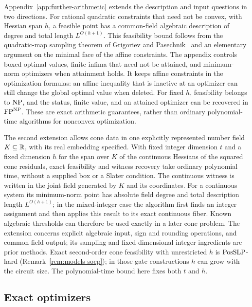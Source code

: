 Appendix~\ref{app:further-arithmetic} extends the description and input
questions in two directions. For rational quadratic constraints that need
not be convex, with Hessian span $h$, a feasible point has a common-field
algebraic description of degree and total length $L^{O(h+1)}$. This
feasibility bound follows from the quadratic-map sampling theorem of
Grigoriev and Pasechnik~\cite[Theorem~1.2]{GrigorievPasechnik2005} and an
elementary argument on the minimal face of the affine constraints. The
appendix controls boxed optimal values, finite infima that need not be
attained, and minimum-norm optimizers when attainment holds. It keeps affine
constraints in the optimization formulas: an affine inequality that is
inactive at an optimizer can still change the global optimal value when
deleted.
For fixed $h$, feasibility belongs to $\mathrm{NP}$, and the status, finite value,
and an attained optimizer can be recovered in $\mathrm{FP}^{\mathrm{NP}}$.
These are exact arithmetic guarantees, rather than ordinary polynomial-time
algorithms for nonconvex optimization.

The second extension allows cone data in one explicitly represented number
field $K\subseteq\mathbb R$, with its real embedding specified. With fixed
integer dimension $t$ and a fixed dimension $h$ for the span over $K$ of the
continuous Hessians of the squared cone residuals, exact feasibility and
witness recovery take ordinary polynomial time,
without a supplied box or a Slater condition. The continuous witness is
written in the joint field generated by $K$ and its coordinates. For a
continuous system its minimum-norm point has absolute field degree and total
description length $L^{O(h+1)}$; in the mixed-integer case the algorithm first
finds an integer assignment and then applies this result to its exact
continuous fiber. Known algebraic
thresholds can therefore be used exactly in a later cone problem. The
extension concerns explicit algebraic input, sign and rounding operations,
and common-field output; its sampling and fixed-dimensional integer
ingredients are prior methods.
Exact second-order cone feasibility with unrestricted $h$ is
$\mathrm{PosSLP}$-hard (Remark~\ref{rem:models-socp}); in those gate constructions
$h$ can grow with the circuit size. The polynomial-time bound here fixes
both $t$ and $h$.

\subsection{Exact optimizers}
\label{sec:intro-optimizers}

